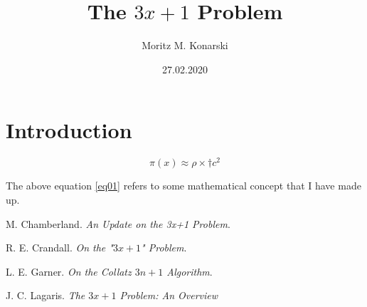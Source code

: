 \documentclass[12pt, a4paper, reqno]{amsart}
\title{The $3x+1$ Problem}
\author{Moritz M. Konarski}
\date{27.02.2020}
\begin{document}
\begin{abstract}
\end{abstract}

\maketitle
\tableofcontents

\section{Introduction}

\begin{equation}
    \pi(x) \approx \rho \times \dagger c^2 \label{eq01}
\end{equation}

The above equation \eqref{eq01} refers to some mathematical concept that
I have made up.


















\begin{thebibliography}{2}
        M. Chamberland. \textit{An Update on the 3x+1 Problem}. 

        R. E. Crandall. \textit{On the "$3x+1$" Problem}. 

        L. E. Garner. \textit{On the Collatz $3n+1$ Algorithm}.

        J. C. Lagaris. \textit{The $3x+1$ Problem: An Overview}
        
\end{thebibliography}
\end{document}
